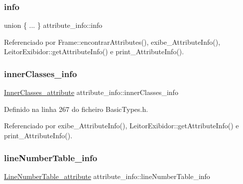 \mbox{\label{structattribute__info_a5ce6e5e84e84941dfa2bab1322be6dcf}} 
\subsubsection{\texorpdfstring{info}{info}}
{\footnotesize\ttfamily union \{ ... \}   attribute\+\_\+info\+::info}



Referenciado por Frame\+::encontrar\+Attributes(), exibe\+\_\+\+Attribute\+Info(), Leitor\+Exibidor\+::get\+Attribute\+Info() e print\+\_\+\+Attribute\+Info().

\mbox{\label{structattribute__info_ab17c5c178068ef13e7f6d61e741bc398}} 
\subsubsection{\texorpdfstring{inner\+Classes\+\_\+info}{innerClasses\_info}}
{\footnotesize\ttfamily \hyperlink{structInnerClasses__attribute}{Inner\+Classes\+\_\+attribute} attribute\+\_\+info\+::inner\+Classes\+\_\+info}



Definido na linha 267 do ficheiro Basic\+Types.\+h.



Referenciado por exibe\+\_\+\+Attribute\+Info(), Leitor\+Exibidor\+::get\+Attribute\+Info() e print\+\_\+\+Attribute\+Info().

\mbox{\label{structattribute__info_a184f00b0276336a22f3a41e55df6ecf9}} 
\subsubsection{\texorpdfstring{line\+Number\+Table\+\_\+info}{lineNumberTable\_info}}
{\footnotesize\ttfamily \hyperlink{structLineNumberTable__attribute}{Line\+Number\+Table\+\_\+attribute} attribute\+\_\+info\+::line\+Number\+Table\+\_\+info}



